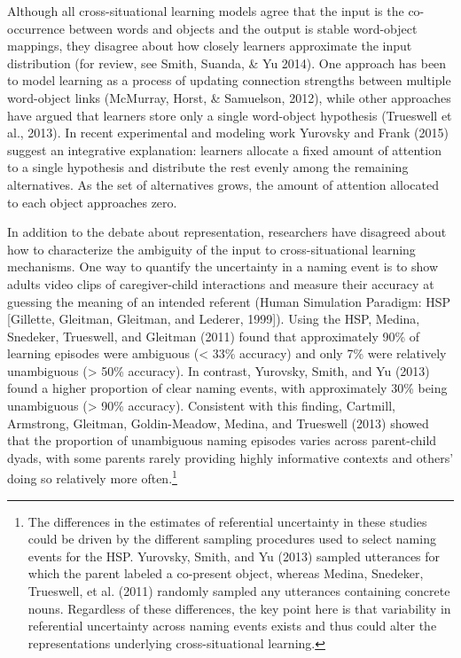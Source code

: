 \documentclass[oneside]{report}
\begin{document}
Although all cross-situational learning models agree that the input is
the co-occurrence between words and objects and the output is stable
word-object mappings, they disagree about how closely learners
approximate the input distribution (for review, see Smith, Suanda, \& Yu
2014). One approach has been to model learning as a process of updating
connection strengths between multiple word-object links (McMurray,
Horst, \& Samuelson, 2012), while other approaches have argued that
learners store only a single word-object hypothesis (Trueswell et al.,
2013). In recent experimental and modeling work Yurovsky and Frank
(2015) suggest an integrative explanation: learners allocate a fixed
amount of attention to a single hypothesis and distribute the rest
evenly among the remaining alternatives. As the set of alternatives
grows, the amount of attention allocated to each object approaches zero.

In addition to the debate about representation, researchers have
disagreed about how to characterize the ambiguity of the input to
cross-situational learning mechanisms. One way to quantify the
uncertainty in a naming event is to show adults video clips of
caregiver-child interactions and measure their accuracy at guessing the
meaning of an intended referent (Human Simulation Paradigm: HSP
{[}Gillette, Gleitman, Gleitman, and Lederer, 1999{]}). Using the HSP,
Medina, Snedeker, Trueswell, and Gleitman (2011) found that
approximately 90\% of learning episodes were ambiguous (\textless{} 33\%
accuracy) and only 7\% were relatively unambiguous (\textgreater{} 50\%
accuracy). In contrast, Yurovsky, Smith, and Yu (2013) found a higher
proportion of clear naming events, with approximately 30\% being
unambiguous (\textgreater{} 90\% accuracy). Consistent with this
finding, Cartmill, Armstrong, Gleitman, Goldin-Meadow, Medina, and
Trueswell (2013) showed that the proportion of unambiguous naming
episodes varies across parent-child dyads, with some parents rarely
providing highly informative contexts and others' doing so relatively
more often.\footnote{The differences in the estimates of referential
  uncertainty in these studies could be driven by the different sampling
  procedures used to select naming events for the HSP. Yurovsky, Smith,
  and Yu (2013) sampled utterances for which the parent labeled a
  co-present object, whereas Medina, Snedeker, Trueswell, et al. (2011)
  randomly sampled any utterances containing concrete nouns. Regardless
  of these differences, the key point here is that variability in
  referential uncertainty across naming events exists and thus could
  alter the representations underlying cross-situational learning.}
\end{document}
